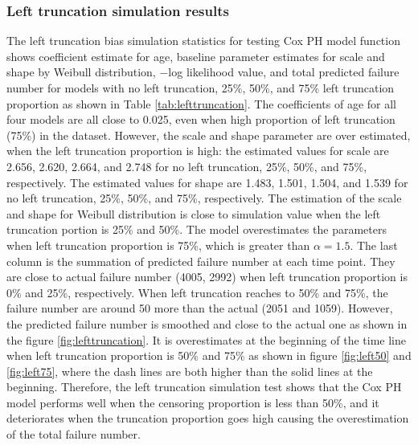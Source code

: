 \documentclass[12pt,letterpaper]{article}
\begin{document}
\subsubsection{Left truncation simulation results}
The left truncation bias simulation statistics for testing Cox PH model function shows coefficient estimate for age, baseline parameter estimates for scale and shape by Weibull distribution, $-$log likelihood value, and total predicted failure number for models with no left truncation, 25\%, 50\%, and 75\% left truncation proportion as shown in Table \ref{tab:lefttruncation}. The coefficients of age for all four models are all close to 0.025, even when high proportion of left truncation (75\%) in the dataset. However, the scale and shape parameter are over estimated, when the left truncation proportion is high: the estimated values for scale are 2.656, 2.620, 2.664, and 2.748 for no left truncation, 25\%, 50\%, and 75\%, respectively. The estimated values for shape are 1.483, 1.501, 1.504, and 1.539 for no left truncation, 25\%, 50\%, and 75\%, respectively. The estimation of the scale and shape for Weibull  distribution is close to simulation value when the left truncation portion is 25\% and 50\%. The model overestimates the parameters when left truncation proportion is 75\%, which is greater than $\alpha=1.5$. The last column is the summation of predicted failure number at each time point. They are close to actual failure number (4005, 2992) when left truncation proportion is 0\% and 25\%, respectively. When left truncation reaches to 50\% and 75\%, the failure number are around 50 more than the actual (2051 and 1059). However, the predicted failure number is smoothed and close to the actual one as shown in the figure \ref{fig:lefttruncation}. It is overestimates at the beginning of the time line when left truncation proportion is 50\% and 75\% as shown in figure \ref{fig:left50} and \ref{fig:left75}, where the dash lines are both higher than the solid lines at the beginning.
Therefore, the left truncation simulation test shows that the Cox PH model performs well when the censoring proportion is less than 50\%, and it deteriorates when the truncation proportion goes high causing the overestimation of the total failure number.
\end{document}
